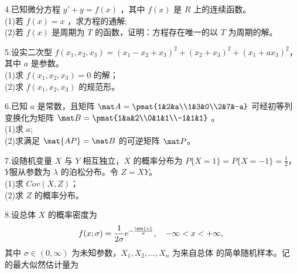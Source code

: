 4.已知微分方程 $y'+y=f(x)$ ，其中 $f(x)$ 是 $R$ 上的连续函数。\\
(1)若 $f(x)=x$ ，求方程的通解;\\
(2)若 $f(x)$ 是周期为 $T$ 的函数，证明：方程存在唯一的以 $T$ 为周期的解。

5.设实二次型 $f(x_1,x_2,x_3)=(x_1-x_2+x_3)^2+(x_2+x_3)^2+(x_1+ax_3)^2$，其中 $a$ 是参数。\\
(1)求 $f(x_1,x_2,x_3)=0$ 的解；\\
(2)求 $f(x_1,x_2,x_3)$ 的规范形。

6.已知 $a$ 是常数，且矩阵 $ \mat A=\pmat{1&2&a\\1&3&0\\2&7&-a}$ 可经初等列变换化为矩阵 $\mat B=\pmat{1&a&2\\0&1&1\\-1&1&1}$ 。\\
(1)求 $a$;\\
(2)求满足 $\mat {AP}=\mat B$ 的可逆矩阵 $\mat P$。

7.设随机变量 $X$ 与 $Y$ 相互独立，$X$ 的概率分布为 $P\{X=1\}=P\{X=-1\}=\frac{1}{2}$，  $Y$服从参数为 $\lambda$ 的泊松分布。令 $Z=XY$。\\
(1)求 $Cov(X,Z)$；\\
(2)求 $Z$ 的概率分布。

8.设总体 $X$ 的概率密度为
$$f(x;\sigma)=\frac{1}{2\sigma}e^{-\frac{\abs{x}}{\sigma}},\quad  -\infty<x<+\infty,~$$
其中 $\sigma \in (0,\infty)$ 为未知参数，$X_1,X_2,\dots,X_n$ 为来自总体 的简单随机样本。记 的最大似然估计量为